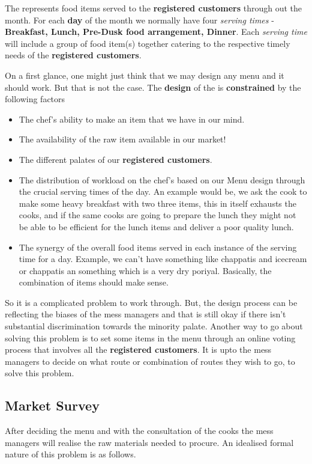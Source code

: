 \documentclass[12pt]{report}
\newcommand{\menu}{\color{red}{\textbf{ Menu}}}
\newcommand{\RC}{\textbf{registered customers}}
\begin{document}
The {\menu} represents food items served to the {\RC} through out the month. For each \textbf{day} of the month we normally have four \textit{serving times} - \textbf{Breakfast, Lunch, Pre-Dusk food arrangement, Dinner}. Each \textit{serving time} will include a group of food item(s) together catering to the respective timely needs of the {\RC}.

On a first glance, one might just think that we may design any menu and it should work. But that is not the case. The \textbf{design} of the {\menu} is \textbf{constrained} by the following factors 
\begin{itemize}
\item The chef's ability to make an item that we have in our mind.
\item The availability of the raw item available in our market!
\item The different palates of our {\RC}.
\item The distribution of workload on the chef's based on our Menu design through the crucial serving times of the day. An example would be, we ask the cook to make some heavy breakfast with two three items, this in itself exhausts the cooks, and if the same cooks are going to prepare the lunch they might not be able to be efficient for the lunch items and deliver a poor quality lunch.
\item  The synergy of the overall food items served in each instance of the serving time for a day. Example, we can't have something like chappatis and icecream or chappatis an something which is a very dry poriyal. Basically, the combination of items should make sense.
\end{itemize}
So it is a complicated problem to work through. But, the design process can be reflecting the biases of the mess managers and that is still okay if there isn't substantial discrimination towards the minority palate. Another way to go about solving this problem is to set some items in the menu through an online voting process that involves all the {\RC}. It is upto the mess managers to decide on what route or combination of routes they wish to go, to solve this problem.  

\subsection{Market Survey}
After deciding the menu and with the consultation of the cooks the mess managers will realise the raw materials needed to procure. An idealised formal nature of this problem is as follows. {\color{red}{Caveat, it is understood that such formal abstraction ignores practical realities and is only helpful as a template to work upon but never mandated to be abided by.}}
\end{document}
